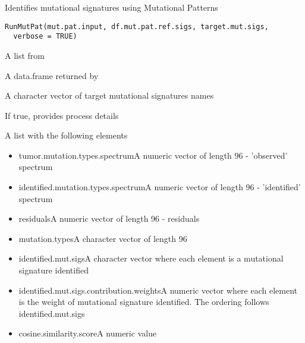 \documentclass[letterpaper]{book}
\begin{document}
%
\begin{Description}\relax
Identifies mutational signatures using Mutational Patterns
\end{Description}
%
\begin{Usage}
\begin{verbatim}
RunMutPat(mut.pat.input, df.mut.pat.ref.sigs, target.mut.sigs,
  verbose = TRUE)
\end{verbatim}
\end{Usage}
%
\begin{Arguments}
\begin{ldescription}
\item[\code{mut.pat.input}] A list from 

\item[\code{df.mut.pat.ref.sigs}] A data.frame returned by 

\item[\code{target.mut.sigs}] A character vector of target mutational signatures names

\item[\code{verbose}] If true, provides process details
\end{ldescription}
\end{Arguments}
%
\begin{Value}
A list with the following elements
\begin{itemize}

\item{} tumor.mutation.types.spectrumA numeric vector of length 96 - 'observed' spectrum
\item{} identified.mutation.types.spectrumA numeric vector of length 96 - 'identified' spectrum
\item{} residualsA numeric vector of length 96 - residuals
\item{} mutation.typesA character vector of length 96
\item{} identified.mut.sigsA character vector where each element is a mutational signature identified
\item{} identified.mut.sigs.contribution.weightsA numeric vector where each element is the weight of mutational signature identified. The ordering follows identified.mut.sigs
\item{} cosine.similarity.scoreA numeric value

\end{itemize}

\end{Value}
\end{document}
